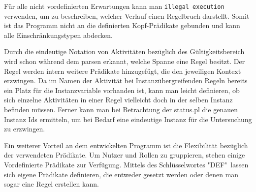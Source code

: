 Für alle nicht vordefinierten Erwartungen kann man \texttt{illegal execution} verwenden, um zu beschreiben, welcher Verlauf einen Regelbruch darstellt. Somit ist das Programm nicht an die definierten Kopf-Prädikate gebunden und kann alle Einschränkungstypen abdecken.

Durch die eindeutige Notation von Aktivitäten bezüglich des Gültigkeitsbereich wird schon während dem parsen erkannt, welche Spanne eine Regel besitzt. Der Regel werden intern weitere Prädikate hinzugefügt, die den jeweiligen Kontext erzwingen. Da im Namen der Aktivität bei Instanzübergreifenden Regeln bereits ein Platz für die Instanzvariable vorhanden ist, kann man leicht definieren, ob sich einzelne Aktivitäten in einer Regel vielleicht doch in der selben Instanz befinden müssen. Ferner kann man bei Betrachtung der status.pl die genauen Instanz Ids ermitteln, um bei Bedarf eine eindeutige Instanz für die Untersuchung zu erzwingen. 

Ein weiterer Vorteil an dem entwickelten Programm ist die Flexibilität bezüglich der verwendeten Prädikate. Um Nutzer und Rollen zu gruppieren, stehen einige Vordefinierte Prädikate zur Verfügung. Mittels des Schlüsselwortes "DEF"\ lassen sich eigene Prädikate definieren, die entweder gesetzt werden oder denen man sogar eine Regel erstellen kann.



